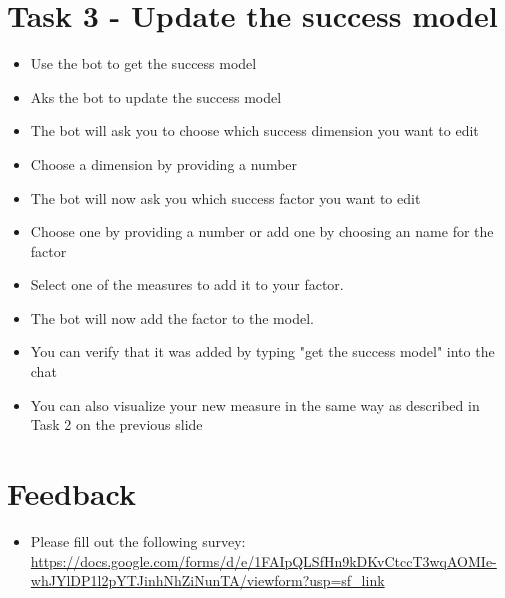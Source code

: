 \section*{Task 3 - Update the success model}
\begin{itemize}
    \item Use the bot to get the success model
    \item Aks the bot to update the success model
    \item The bot will ask you to choose which success dimension you want to edit
    \item Choose a dimension by providing a number
    \item The bot will now ask you which success factor you want to edit
    \item Choose one by providing a number or add one by choosing an name for the factor
    \item Select one of the measures to add it to your factor. 
    \item The bot will now add the factor to the model.
    \item You can verify that it was added by typing "get the success model" into the chat
    \item You can also visualize your new measure in the same way as described in Task 2 on the previous slide
\end{itemize}

\section*{Feedback}
  
\begin{itemize}
  \item Please fill out the following survey: \url{https://docs.google.com/forms/d/e/1FAIpQLSfHn9kDKvCtccT3wqAOMIe-whJYlDP1l2pYTJinhNhZiNunTA/viewform?usp=sf_link}
\end{itemize}

